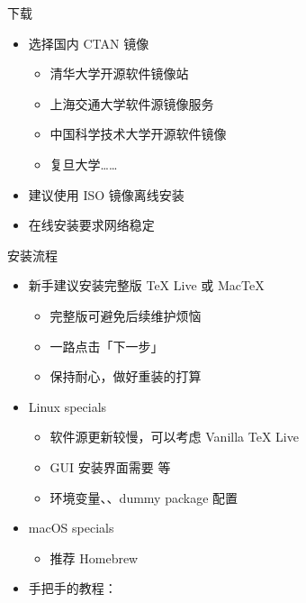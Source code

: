 \begin{frame}{下载}
\begin{itemize}
  \item 选择国内 CTAN 镜像

    \begin{itemize}
      \item 清华大学开源软件镜像站 
      \item 上海交通大学软件源镜像服务 
      \item 中国科学技术大学开源软件镜像  \pause
      \item 复旦大学……
    \end{itemize} \pause

  \item 建议使用 ISO 镜像离线安装
  \item 在线安装要求网络稳定
\end{itemize}
\end{frame}

\begin{frame}{安装流程}
\begin{itemize}
  \item 新手建议安装完整版 \TeX{} Live 或 Mac\TeX{}

    \begin{itemize}
      \item 完整版可避免后续维护烦恼
      \item 一路点击「下一步」
      \item 保持耐心，做好重装的打算
    \end{itemize} \pause

  \item Linux specials

    \begin{itemize}
      \item 软件源更新较慢，可以考虑 Vanilla \TeX{} Live
      \item GUI 安装界面需要  等
      \item 环境变量、、dummy package 配置
    \end{itemize}

  \item macOS specials

    \begin{itemize}
      \item 推荐 Homebrew \href{https://brew.sh/}{\faBeer}
    \end{itemize}

  \item 手把手的教程：
\end{itemize}
\end{frame}

